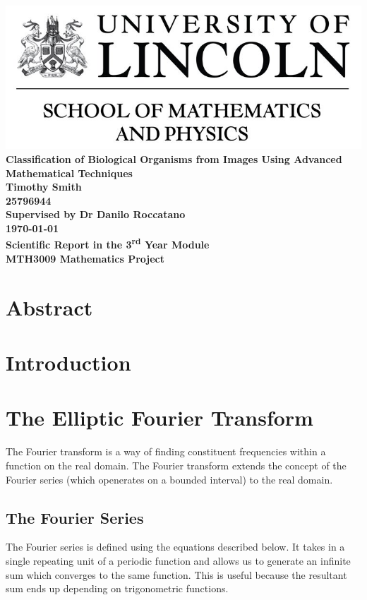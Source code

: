 \documentclass[12pt,english]{article}
\begin{document}
\begin{center}
\includegraphics[scale = 0.5]{LincolnLogo}
\newline\newline
\thispagestyle{empty}
    \textbf{\huge{Classification of Biological Organisms from Images Using Advanced Mathematical Techniques} \\
    [100pt] \Large{Timothy Smith\\25796944} \\
    [40pt]\LARGE{Supervised by Dr Danilo Roccatano}\\
    [50pt]\today \\
	[40pt]Scientific Report in the 3\textsuperscript{rd} Year Module\\ MTH3009 Mathematics Project  }
\end{center}

\newpage
\section*{Abstract}

\newpage
\tableofcontents

\section{Introduction}
\section{The Elliptic Fourier Transform}
The Fourier transform is a way of finding constituent frequencies within a function on the real domain.
The Fourier transform extends the concept of the Fourier series (which openerates on a bounded interval) to the real
domain.

\subsection{The Fourier Series}
The Fourier series is defined using the equations described below.
It takes in a single repeating unit of a periodic function and allows us to generate an infinite sum which converges
to the same function. This is useful because the resultant sum ends up depending on trigonometric functions.
\end{document}
